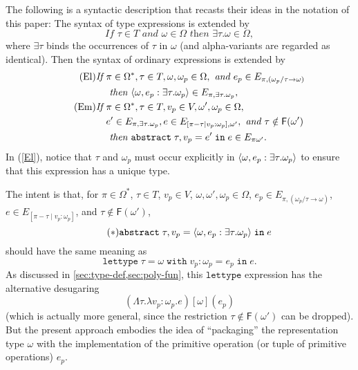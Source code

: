 \documentclass[sigplan,screen,nonacm,balance=false]{acmart}
\theoremstyle{plain}
\DeclarePairedDelimiter{\pair}{\langle}{\rangle}
\newcommand{\lettype}{\mathtt{lettype}}
\newcommand{\letwith}[6]{\mathtt{lettype} \; #1 = #2 \; \mathtt{with} \; #3 : #4 = #5 \; \mathtt{in} \; #6}
\newcommand{\abstractin}[4]{\mathtt{abstract} \; #1, #2 = #3 \; \mathtt{in} \; #4}
\newcommand{\FV}{\mathsf{F}}
\begin{document}
The following is a syntactic description that recasts their ideas in the notation of this paper:
The syntax of type expressions is extended by
%
\begin{equation*}\tag{$\Omega 6$}
  \textit{If } \tau \in T \textit{ and } \omega \in \Omega \textit{ then } \exists \tau. \omega \in \Omega,
\end{equation*}
%
where $\exists \tau$ binds the occurrences of $\tau$ in $\omega$ (and alpha-variants are regarded as identical).
Then the syntax of ordinary expressions is extended by
%
\begin{align*}
  \tag{El} \label{El}
  \textit{If } & \pi \in \Omega^*, \tau \in T, \omega, \omega_p \in \Omega, \textit{ and } e_p \in E_{\pi, (\omega_p/\tau \to \omega)} \\
  & \textit{ then } \pair{\omega, e_p : \exists \tau. \omega_p} \in E_{\pi, \exists \tau. \omega_p}, \\
  \tag{Em}
  \textit{If } & \pi \in \Omega^*, \tau \in T, v_p \in V, \omega', \omega_p \in \Omega, \\
  & e' \in E_{\pi, \exists \tau. \omega_p}, e \in E_{[\pi - \tau \mid v_p : \omega_p], \omega'}, \textit{ and } \tau \notin \FV(\omega') \\
  & \textit{ then } \abstractin{\tau}{v_p}{e'}{e} \in E_{\pi \omega'}.
\end{align*}
%
In (\ref{El}), notice that $\tau$ and $\omega_p$ must occur explicitly in $\pair{\omega, e_p : \exists \tau. \omega_p}$ to ensure that this expression has a unique type.

The intent is that, for $\pi \in \Omega^*$, $\tau \in T$, $v_p \in V$, $\omega, \omega', \omega_p \in \Omega$, $e_p \in E_{\pi, (\omega_p/\tau \to \omega)}$, $e \in E_{[\pi - \tau \mid v_p : \omega_p]}$, and $\tau \notin \FV(\omega')$,
%
\begin{equation*}\tag{$\ast$}\label{star}
  \abstractin{\tau}{v_p}{\pair{\omega, e_p : \exists \tau. \omega_p}}{e}
\end{equation*}
%
should have the same meaning as
%
\begin{equation*}
  \letwith{\tau}{\omega}{v_p}{\omega_p}{e_p}{e}.
\end{equation*}
%
As discussed in \cref{sec:type-def,sec:poly-fun}, this $\lettype$ expression has the alternative desugaring
%
\begin{equation*}\tag{$\ast\ast$}\label{starstar}
  (\Lambda \tau. \lambda v_p: \omega_p. e)[\omega](e_p)
\end{equation*}
%
(which is actually more general, since the restriction $\tau \notin \FV(\omega')$ can be dropped).
But the present approach embodies the idea of ``packaging'' the representation type $\omega$ with the implementation of the primitive operation (or tuple of primitive operations) $e_p$.
\end{document}
